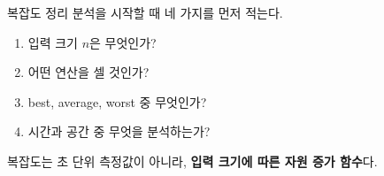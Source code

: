 \begin{frame}{복잡도 정리}
  분석을 시작할 때 네 가지를 먼저 적는다.
  \begin{enumerate}
    \item 입력 크기 $n$은 무엇인가?
    \item 어떤 연산을 셀 것인가?
    \item best, average, worst 중 무엇인가?
    \item 시간과 공간 중 무엇을 분석하는가?
  \end{enumerate}
  \begin{takeaway}
    복잡도는 초 단위 측정값이 아니라, \textbf{입력 크기에 따른 자원 증가 함수}다.
  \end{takeaway}
\end{frame}

